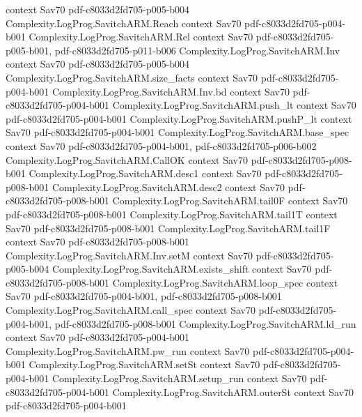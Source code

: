 \begin{theorem}
  {context}
  {Sav70}
  {pdf-c8033d2fd705-p005-b004}
\proofstep
  {Complexity.LogProg.SavitchARM.Reach}
  {context}
  {Sav70}
  {pdf-c8033d2fd705-p004-b001}
\proofstep
  {Complexity.LogProg.SavitchARM.Rel}
  {context}
  {Sav70}
  {pdf-c8033d2fd705-p005-b001,
    pdf-c8033d2fd705-p011-b006}
\proofstep
  {Complexity.LogProg.SavitchARM.Inv}
  {context}
  {Sav70}
  {pdf-c8033d2fd705-p005-b004}
\proofstep
  {Complexity.LogProg.SavitchARM.size_facts}
  {context}
  {Sav70}
  {pdf-c8033d2fd705-p004-b001}
\proofstep
  {Complexity.LogProg.SavitchARM.Inv.bd}
  {context}
  {Sav70}
  {pdf-c8033d2fd705-p004-b001}
\proofstep
  {Complexity.LogProg.SavitchARM.push_lt}
  {context}
  {Sav70}
  {pdf-c8033d2fd705-p004-b001}
\proofstep
  {Complexity.LogProg.SavitchARM.pushP_lt}
  {context}
  {Sav70}
  {pdf-c8033d2fd705-p004-b001}
\proofstep
  {Complexity.LogProg.SavitchARM.base_spec}
  {context}
  {Sav70}
  {pdf-c8033d2fd705-p004-b001,
    pdf-c8033d2fd705-p006-b002}
\proofstep
  {Complexity.LogProg.SavitchARM.CallOK}
  {context}
  {Sav70}
  {pdf-c8033d2fd705-p008-b001}
\proofstep
  {Complexity.LogProg.SavitchARM.desc1}
  {context}
  {Sav70}
  {pdf-c8033d2fd705-p008-b001}
\proofstep
  {Complexity.LogProg.SavitchARM.desc2}
  {context}
  {Sav70}
  {pdf-c8033d2fd705-p008-b001}
\proofstep
  {Complexity.LogProg.SavitchARM.tail0F}
  {context}
  {Sav70}
  {pdf-c8033d2fd705-p008-b001}
\proofstep
  {Complexity.LogProg.SavitchARM.tail1T}
  {context}
  {Sav70}
  {pdf-c8033d2fd705-p008-b001}
\proofstep
  {Complexity.LogProg.SavitchARM.tail1F}
  {context}
  {Sav70}
  {pdf-c8033d2fd705-p008-b001}
\proofstep
  {Complexity.LogProg.SavitchARM.Inv.setM}
  {context}
  {Sav70}
  {pdf-c8033d2fd705-p005-b004}
\proofstep
  {Complexity.LogProg.SavitchARM.exists_shift}
  {context}
  {Sav70}
  {pdf-c8033d2fd705-p008-b001}
\proofstep
  {Complexity.LogProg.SavitchARM.loop_spec}
  {context}
  {Sav70}
  {pdf-c8033d2fd705-p004-b001,
    pdf-c8033d2fd705-p008-b001}
\proofstep
  {Complexity.LogProg.SavitchARM.call_spec}
  {context}
  {Sav70}
  {pdf-c8033d2fd705-p004-b001,
    pdf-c8033d2fd705-p008-b001}
\proofstep
  {Complexity.LogProg.SavitchARM.ld_run}
  {context}
  {Sav70}
  {pdf-c8033d2fd705-p004-b001}
\proofstep
  {Complexity.LogProg.SavitchARM.pw_run}
  {context}
  {Sav70}
  {pdf-c8033d2fd705-p004-b001}
\proofstep
  {Complexity.LogProg.SavitchARM.setSt}
  {context}
  {Sav70}
  {pdf-c8033d2fd705-p004-b001}
\proofstep
  {Complexity.LogProg.SavitchARM.setup_run}
  {context}
  {Sav70}
  {pdf-c8033d2fd705-p004-b001}
\proofstep
  {Complexity.LogProg.SavitchARM.outerSt}
  {context}
  {Sav70}
  {pdf-c8033d2fd705-p004-b001}

\end{theorem}
